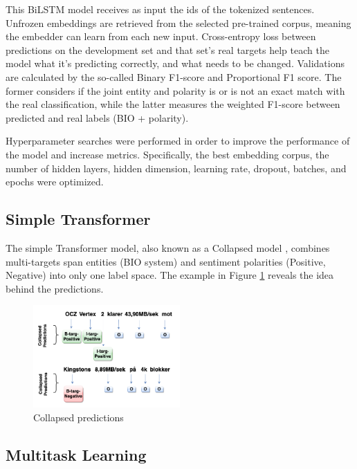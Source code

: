 \documentclass[11pt,a4paper]{article}
\begin{document}
This BiLSTM model receives as input the ids of the tokenized sentences.
Unfrozen embeddings are retrieved from the selected pre-trained corpus, meaning the embedder can learn from each new input. 
Cross-entropy loss between predictions on the development set and that set's real targets help teach the model what it's predicting correctly, and what needs to be changed. Validations are calculated by the so-called Binary F1-score and Proportional F1 score. The former considers if the joint entity and polarity is or is not an exact match with the real classification, while the latter measures the weighted F1-score between predicted and real labels (BIO + polarity).

Hyperparameter searches were performed in order to improve the performance of the model and increase metrics. Specifically, the best embedding corpus, the number of hidden layers, hidden dimension, learning rate, dropout, batches, and epochs were optimized.

\subsection{Simple Transformer}
\label{sec:Simple Transformer}

The simple Transformer model, also known as a Collapsed model \cite{hu-etal-2019-open}, combines multi-targets span entities (BIO system) and sentiment polarities (Positive, Negative) into only one label space. The example in Figure \ref{fig:Collapsed model} reveals the idea behind the predictions.

\begin{figure}[!htb]
    \centering
    \includegraphics[width=0.5\textwidth]{pictures/Transformer.png}
    \caption{Collapsed predictions}
    \label{fig:Collapsed model}
\end{figure}


\subsection{Multitask Learning}
\label{mtlgeneral}
\end{document}
